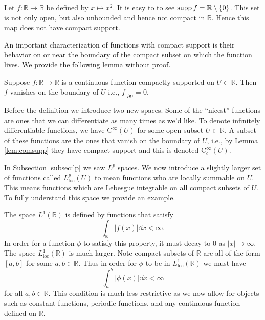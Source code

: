 \begin{example}
Let $f:\mathbb{R}\to\mathbb{R}$ be defined by $x\mapsto x^2$. It is easy to to see $\operatorname{supp}{f} = \mathbb{R}\setminus \{0\}$. This set is not only open, but also unbounded and hence not compact in $\mathbb{R}$. Hence this map does not have compact support.
\end{example}

An important characterization of functions with compact support is their behavior on or near the boundary of the compact subset on which the function lives. We provide the following lemma without proof.

\begin{lemma}\label{lem:comsupp}
Suppose $f:\mathbb{R}\to\mathbb{R}$ is a continuous function compactly supported on $U\subset\mathbb{R}$. Then $f$ vanishes on the boundary of $U$ i.e., $f|_{\partial U} = 0$. 
\end{lemma}


Before the definition we introduce two new spaces. Some of the ``nicest'' functions are ones that we can differentiate as many times as we'd like. To denote infinitely differentiable functions, we have $\mathrm{C}^\infty(U)$ for some open subset $U\subset \mathbb{R}$. A subset of these functions are the ones that vanish on the boundary of $U$, i.e., by Lemma \ref{lem:comsupp} they have compact support and this is denoted $\mathrm{C}_c^\infty(U)$.

In Subsection \ref{subsec:lp} we saw $L^p$ spaces. We now introduce a slightly larger set of functions called $L^p_\text{loc}(U)$ to mean functions who are locally summable on $U$. This means functions which are Lebesgue integrable on all compact subsets of $U$. To fully understand this space we provide an example.

\begin{example}
The space $L^1(\mathbb{R})$ is defined by functions that satisfy
\begin{equation*}
\int_\mathbb{R}|f(x)|\dd{x} < \infty.
\end{equation*}
In order for a function $\phi$ to satisfy this property, it must decay to 0 as $|x|\to\infty$. The space $L^1_\text{loc}(\mathbb{R})$ is much larger. Note compact subsets of $\mathbb{R}$ are all of the form $[a,b]$ for some $a,b\in\mathbb{R}$. Thus in order for $\phi$ to be in $L^1_\text{loc}(\mathbb{R})$ we must have \begin{equation*}
\int_a^b|\phi(x)|\dd{x} < \infty
\end{equation*}
for all $a,b\in\mathbb{R}$. This condition is much less restrictive as we now allow for objects such as constant functions, periodic functions, and any continuous function defined on $\mathbb{R}$.
\end{example}

